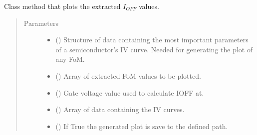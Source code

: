 \documentclass[letterpaper,10pt,english,openany, oneside]{sphinxmanual}
\begin{document}
\begin{fulllineitems}
\begin{fulllineitems}
\label{\detokenize{index:fompy.fom.ioff_ext.plot}}
Class method that plots the extracted \(I_{OFF}\) values.
\begin{quote}\begin{description}
\item[{Parameters}] \leavevmode\begin{itemize}
\item {} 
 () \textendash{} Structure of data containing the most important parameters of a semiconductor’s IV curve.
Needed for generating the plot of any FoM.

\item {} 
 () \textendash{} Array of extracted FoM values to be plotted.

\item {} 
 () \textendash{} Gate voltage value used to calculate IOFF at.

\item {} 
 () \textendash{} Array of data containing the IV curves.

\item {} 
 () \textendash{} If True the generated plot is save to the defined path.

\end{itemize}

\end{description}\end{quote}

\end{fulllineitems}



\end{fulllineitems}
\end{document}
